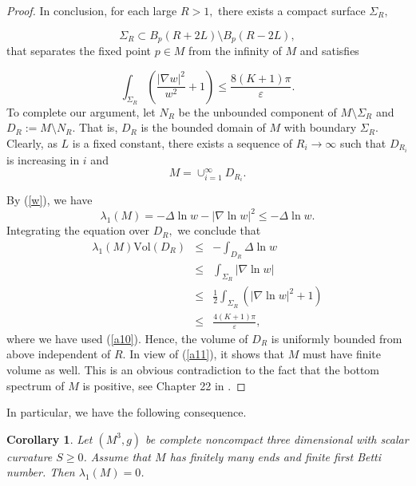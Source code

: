 \documentclass[10pt,a4paper]{amsart}
\newtheorem{corollary}[theorem]{Corollary}
\numberwithin{equation}{section}
\begin{document}
\begin{proof}
In conclusion, for each large $R>1,$ there exists a compact surface $\Sigma_{R},$ 

\begin{equation*}
\Sigma _{R}\subset B_{p}\left( R+2L\right) \setminus B_{p}\left( R-2L\right),
\end{equation*}
that separates the fixed point $p\in M$ from the infinity of $M$ and satisfies

\begin{equation}
\int_{\Sigma _{R}}\left( \frac{\left\vert \nabla w\right\vert ^{2}}{w^{2}}%
+1\right) \leq \frac{8\left( K+1\right) \pi }{\varepsilon }.  \label{a10}
\end{equation}
To complete our argument, let $N_{R}$ be the unbounded component of $M\setminus \Sigma _{R}$ and 
$D_{R}:=M\setminus N_{R}$. That is, $D_{R}$ is the bounded domain of $M$ with
boundary $\Sigma _{R}.$ Clearly,  as $L$ is a fixed constant, there exists a sequence of $R_i\to \infty$
such that $D_{R_i}$ is increasing in $i$ and
\begin{equation}
M=\cup _{i=1}^\infty D_{R_i}.  \label{a11}
\end{equation}

By (\ref{w}), we have
\begin{equation*}
\lambda _{1}\left( M\right) =-\Delta \ln w-\left\vert \nabla \ln
w\right\vert ^{2}\leq -\Delta \ln w.
\end{equation*}%
Integrating the equation over $D_R,$ we conclude that 
\begin{eqnarray*}
\lambda _{1}\left( M\right) \mathrm{Vol}\left( D_{R}\right) &\leq
&-\int_{D_{R}}\Delta \ln w \\
&\leq &\int_{\Sigma _{R}}\left\vert \nabla \ln w\right\vert \\
&\leq &\frac{1}{2}\int_{\Sigma _{R}}\left( \left\vert \nabla \ln
w\right\vert ^{2}+1\right) \\
&\leq &\frac{4\left( K+1\right) \pi }{\varepsilon },
\end{eqnarray*}
where we have used (\ref{a10}).
Hence, the volume of $D_{R}$ is uniformly bounded from above independent of $R.$ In view of (\ref{a11}), it shows that
$M$ must have finite volume as well. This is an obvious contradiction to the fact that the bottom spectrum of $M$ is positive, see Chapter 22 in \cite{Li}.
\end{proof}

In particular, we have the following consequence.

\begin{corollary}
Let $\left( M^{3},g\right) $ be complete noncompact three dimensional with
scalar curvature $S\geq 0$. Assume that $M$ has finitely many ends and
finite first Betti number. Then $\lambda _{1}\left( M\right) =0$.
\end{corollary}
\end{document}
